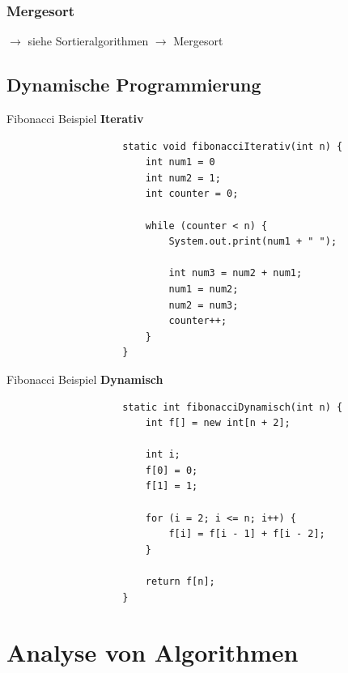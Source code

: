 \documentclass[a4paper, landscape, 8pt]{scrartcl}
\begin{document}
\begin{multicols*}{4}
                \subsubsection{Mergesort}
                    $\to$ siehe Sortieralgorithmen $\to$ Mergesort

            \subsection{Dynamische Programmierung}
            \textcolor{subsectioncolor}{Fibonacci Beispiel {\bfseries Iterativ}}
            \begin{lstlisting}
                    static void fibonacciIterativ(int n) {
                        int num1 = 0
                        int num2 = 1;
                        int counter = 0;

                        while (counter < n) {
                            System.out.print(num1 + " ");

                            int num3 = num2 + num1;
                            num1 = num2;
                            num2 = num3;
                            counter++;
                        }
                    }
            \end{lstlisting}
            \textcolor{subsectioncolor}{Fibonacci Beispiel {\bfseries Dynamisch}}
            \begin{lstlisting}
                    static int fibonacciDynamisch(int n) {
                        int f[] = new int[n + 2];

                        int i;
                        f[0] = 0;
                        f[1] = 1;

                        for (i = 2; i <= n; i++) {
                            f[i] = f[i - 1] + f[i - 2];
                        }

                        return f[n];
                    }
            \end{lstlisting}

        \section{Analyse von Algorithmen}

\end{multicols*}
\end{document}
